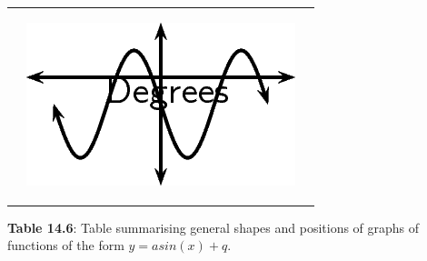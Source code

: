 \begin{center}
\begin{xtabular*}{\mytablewidth}[t]{|p{10\mystarwidth}|p{10\mystarwidth}|p{10\mystarwidth}|}
                 &
    
    
        
                  
    \setcounter{subfigure}{0}

\label{m39414*id85433}
    \begin{center}
    \label{m39414*id85433!!!underscore!!!media}\label{m39414*id85433!!!underscore!!!printimage}\includegraphics{col11306.imgs/m39414_MG10C15_022.png} %
        
      \vspace{2pt}
    \vspace{.1in}
    
    \end{center}



    \addtocounter{footnote}{-0}
    
     \tabularnewline{}
    \end{xtabular*}
      \end{center}
    \begin{center}{\small\bfseries Table 14.6}: Table summarising general shapes and positions of graphs of functions of the form \begin{math}y=asin\left(x\right)+q\end{math}.\end{center}
    
    \addtocounter{footnote}{-0}
    
    \par
  

        \label{m39414*uid47}

